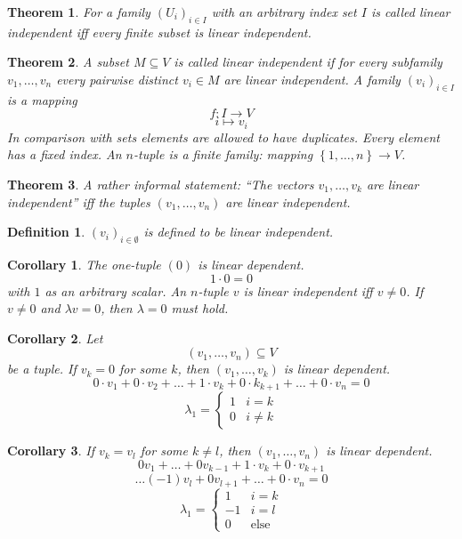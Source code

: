 \documentclass[a4paper,landscape,twocolumn]{article}
\newcommand\set[1]{\left\{#1\right\}}
\newtheorem{theorem}{Theorem}
\newtheorem{defi}{Definition}
\newtheorem{cor}{Corollary}
\begin{document}
\begin{theorem}
  For a family $(U_i)_{i \in I}$ with an arbitrary index set $I$ is called linear independent
  iff every finite subset is linear independent.
\end{theorem}

\begin{theorem}
  A subset $M \subseteq V$ is called linear independent if for every subfamily $v_1, \ldots, v_n$ every pairwise distinct $v_i \in M$ are linear independent.
  A \emph{family} $(v_i)_{i \in I}$ is a mapping
  \[ f: I \rightarrow V \]
  \[ i \mapsto v_i \]
  In comparison with sets elements are allowed to have duplicates. Every element has a fixed index.
  An $n$-tuple is a finite family: mapping $\set{1, \ldots, n} \rightarrow V$.
\end{theorem}

\begin{theorem}
  A rather informal statement:
  \enquote{The vectors $v_1, \ldots, v_k$ are linear independent} iff the tuples $(v_1, \ldots, v_n)$ are linear independent.
\end{theorem}

\begin{defi}
  $(v_i)_{i \in \emptyset}$ is defined to be linear independent.
\end{defi}

\begin{cor}
  The one-tuple $(0)$ is linear dependent.
  \[ 1 \cdot 0 = 0 \]
  with $1$ as an arbitrary scalar.
  An $n$-tuple $v$ is linear independent iff $v \neq 0$.
  If $v \neq 0$ and $\lambda v = 0$, then $\lambda = 0$ must hold.
\end{cor}

\begin{cor}
  Let
  \[ (v_1, \ldots, v_n) \subseteq V \]
  be a tuple. If $v_k = 0$ for some $k$, then $(v_1, \ldots, v_k)$ is linear dependent.
  \[ 0 \cdot v_1 + 0 \cdot v_2 + \ldots + 1 \cdot v_k + 0 \cdot k_{k + 1} + \ldots + 0 \cdot v_n = 0 \]
  \[
      \lambda_1 = \begin{cases}
        1 & i = k \\
        0 & i \neq k
      \end{cases}
  \]
\end{cor}

\begin{cor}
  If $v_k = v_l$ for some $k \neq l$, then $(v_1, \ldots, v_n)$ is linear dependent.
  \[ 0 v_1 + \ldots + 0 v_{k - 1} + 1 \cdot v_k + 0 \cdot v_{k+1} \]
  \[  \ldots (-1) v_l + 0 v_{l+1} + \ldots + 0 \cdot v_n = 0 \]
  \[
    \lambda_1 = \begin{cases}
      1  & i = k \\
      -1 & i = l \\
      0  & \text{else}
    \end{cases}
  \]
\end{cor}
\end{document}
